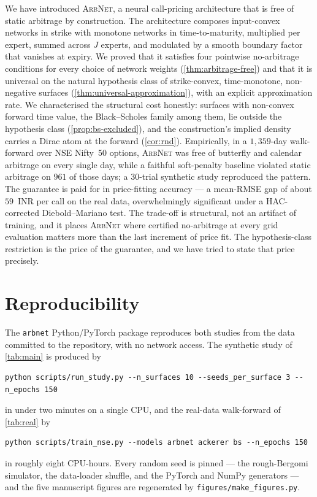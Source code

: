 \documentclass[largeformat]{interact}
\theoremstyle{plain}
\theoremstyle{definition}
\newcommand{\arbnet}{\textsc{ArbNet}}
\newcommand{\bs}{Black--Scholes}
\begin{document}
We have introduced \arbnet{}, a neural call-pricing architecture that is free of static arbitrage by construction. The architecture composes input-convex networks in strike with monotone networks in time-to-maturity, multiplied per expert, summed across $J$ experts, and modulated by a smooth boundary factor that vanishes at expiry. We proved that it satisfies four pointwise no-arbitrage conditions for every choice of network weights (\cref{thm:arbitrage-free}) and that it is universal on the natural hypothesis class of strike-convex, time-monotone, non-negative surfaces (\cref{thm:universal-approximation}), with an explicit approximation rate. We characterised the structural cost honestly: surfaces with non-convex forward time value, the \bs{} family among them, lie outside the hypothesis class (\cref{prop:bs-excluded}), and the construction's implied density carries a Dirac atom at the forward (\cref{cor:rnd}). Empirically, in a $1{,}359$-day walk-forward over NSE Nifty~50 options, \arbnet{} was free of butterfly and calendar arbitrage on every single day, while a faithful soft-penalty baseline violated static arbitrage on $961$ of those days; a $30$-trial synthetic study reproduced the pattern. The guarantee is paid for in price-fitting accuracy --- a mean-RMSE gap of about $59$~INR per call on the real data, overwhelmingly significant under a HAC-corrected Diebold--Mariano test. The trade-off is structural, not an artifact of training, and it places \arbnet{} where certified no-arbitrage at every grid evaluation matters more than the last increment of price fit. The hypothesis-class restriction is the price of the guarantee, and we have tried to state that price precisely.

\section{Reproducibility}
\label{sec:reproducibility}

The \texttt{arbnet} Python/PyTorch package reproduces both studies from the data committed to the repository, with no network access. The synthetic study of \cref{tab:main} is produced by
\begin{verbatim}
python scripts/run_study.py --n_surfaces 10 --seeds_per_surface 3 --n_epochs 150
\end{verbatim}
in under two minutes on a single CPU, and the real-data walk-forward of \cref{tab:real} by
\begin{verbatim}
python scripts/train_nse.py --models arbnet ackerer bs --n_epochs 150
\end{verbatim}
in roughly eight CPU-hours. Every random seed is pinned --- the rough-Bergomi simulator, the data-loader shuffle, and the PyTorch and NumPy generators --- and the five manuscript figures are regenerated by \texttt{figures/make\_figures.py}.
\end{document}
